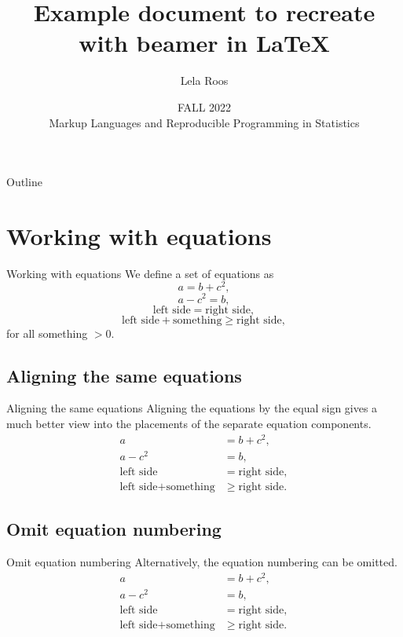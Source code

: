 \documentclass[aspectratio=169]{beamer}
\title{Example document to recreate with beamer in \LaTeX}
\author{Lela Roos}
\date{FALL 2022 \\
Markup Languages and Reproducible Programming in Statistics}
\institute{}
\begin{document}
\begin{frame}
  \titlepage
\end{frame}

\begin{frame}{Outline}
    \tableofcontents
\end{frame}

\section{Working with equations}
\begin{frame}{Working with equations}
We define a set of equations as
\begin{equation}
a = b + c^2,
\end{equation}
\begin{equation}
a - c^2 = b,
\end{equation}
\begin{equation}
\text{left side} = \text{right side},
\end{equation}
\begin{equation}
\text{left side} + \text{something} \geq \text{right side},
\end{equation}
for all something $> 0$.
\end{frame}

\subsection{Aligning the same equations}
\begin{frame}{Aligning the same equations}
Aligning the equations by the equal sign gives a much better view into the placements of the separate equation components.
\begin{align}
a &= b + c^2, \\
a - c^2 &= b, \\
\text{left side} &= \text{right side}, \\
\text{left side} + \text{something} &\geq \text{right side}.
\end{align}
\end{frame}

\subsection{Omit equation numbering}
\begin{frame}{Omit equation numbering}
Alternatively, the equation numbering can be omitted.
\begin{align*}
a &= b + c^2, \\
a - c^2 &= b, \\
\text{left side} &= \text{right side}, \\
\text{left side} + \text{something} &\geq \text{right side}.
\end{align*}
\end{frame}
\end{document}

